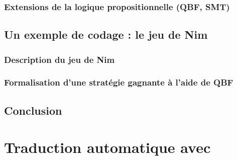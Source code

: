 \documentclass[a4paper,12pt,oneside]{extbook}
\begin{document}
\subsection{Extensions de la logique propositionnelle (QBF, SMT)}

\section{Un exemple de codage : le jeu de Nim}
\subsection{Description du jeu de Nim}

\subsection{Formalisation d'une stratégie gagnante à l'aide de QBF}



%






\section{Conclusion}



\chapter{Traduction automatique avec \touist}\label{chap:touist}
\end{document}
